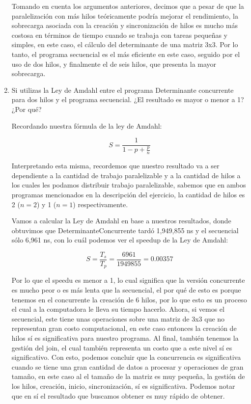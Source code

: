 \begin{enumerate}
Tomando en cuenta los argumentos anteriores, decimos que a pesar de que la paralelización con más hilos teóricamente podría mejorar el rendimiento, la sobrecarga asociada con la creación y sincronización de hilos es mucho más costosa en términos de tiempo cuando se trabaja con tareas pequeñas y simples, en este caso, el cálculo del determinante de una matriz 3x3. Por lo tanto, el programa secuencial es el más eficiente en este caso, seguido por el uso de dos hilos, y finalmente el de seis hilos, que presenta la mayor sobrecarga.


    \hfill    
    
    \item Si utilizas la Ley de Amdahl entre el programa Determinante concurrente para dos hilos y el programa secuencial. ¿El resultado es mayor o menor a 1? ¿Por qué?

    Recordando nuestra fórmula de la ley de Amdahl:

    \[ S = \frac{1}{1-p + \frac{p}{n}}\]

    Interpretando esta misma, recordemos que nuestro resultado va a ser dependiente a la cantidad de trabajo paralelizable y a la cantidad de hilos a los cuales les podamos distribuir trabajo paralelizable, sabemos que en ambos programas mencionados en la descripción del ejercicio, la cantidad de hilos es 2 ($n=2$) y 1 ($n=1$) respectivamente.

    Vamos a calcular la Ley de Amdahl en base a nuestros resultados, donde obtuvimos que DeterminanteConcurrente tardó 1,949,855 ns y el secuencial sólo 6,961 ns, con lo cuál
    podemos ver el speedup de la Ley de Amdahl:

    \[S = \frac{T_s}{T_p}=\frac{6961}{1949855}=0.00357\]

    Por lo que el speedu es menor a 1, lo cual significa que la versión concurrente es mucho peor o es más lenta que la secuencial, el por qué de esto es porque tenemos en el concurrente la creación de 6 hilos, por lo que esto es un proceso el cual a la computadora le lleva su tiempo hacerlo. Ahora, si vemos el secuencial, este tiene unas operaciones sobre una matriz de 3x3 que no representan gran costo computacional, en este caso entonces la creación de hilos sí es significativa para nuestro programa.
    Al final, también tenemos la gestión del join, el cual también representa un costo que a este nivel sí es significativo.
    Con esto, podemos concluir que la concurrencia es significativa cuando se tiene una gran cantidad de datos a procesar y operaciones de gran tamaño, en este caso al el tamaño
    de la matriz es muy pequeña, la gestión de los hilos, creación, inicio, sincronización, sí es significativa.
    Podemos notar que en sí el resultado que buscamos obtener es muy rápido de obtener.


\end{enumerate}
